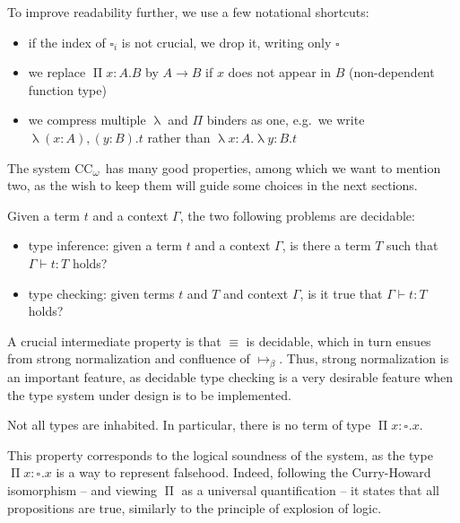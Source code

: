 \documentclass{kaobook}
\newcommand{\uni}[1][]{\square_{#1}}
\newcommand{\conv}{\equiv}
\newcommand{\red}{\mapsto}
\newcommand{\bred}{\red_\beta}
\renewcommand{\P}{\operatorname{\Pi}}
\DeclareMathOperator{\?}{?}
\renewcommand{\l}{\operatorname{\lambda}}
\newcommand{\coc}{CC\textsubscript{$\omega$}}
\begin{document}
{


To improve readability further, we use a few notational shortcuts:
\begin{itemize}
	\item if the index of $\uni[i]$ is not crucial, we drop it, writing only $\uni$
	\item we replace $ \P x : A . B$ by $A \to B$ if $x$ does not appear in $B$ (non-dependent function type)
	\item we compress multiple $\l$ and $\Pi$ binders as one, e.g.\ we write $\l (x : A),(y : B) . t$ rather than $\l x : A . \l y : B . t$
\end{itemize}

The system \coc\ has many good properties, among which we want to mention two, as the wish to keep them will guide some choices in the next sections.

\begin{prop}
	Given a term $t$ and a context $\Gamma$, the two following problems are decidable:
	\begin{itemize}
		\item type inference: given a term $t$ and a context $\Gamma$, is there a term $T$ such that $\Gamma \vdash t : T$ holds?
		\item type checking: given terms $t$ and $T$ and context $\Gamma$, is it true that $\Gamma \vdash t : T$ holds?
	\end{itemize}
\end{prop}

 A crucial intermediate property is that $\conv$ is decidable, which in turn ensues from strong normalization and confluence of $\bred$. Thus, strong normalization is an important feature, as decidable type checking is a very desirable feature when the type system under design is to be implemented.
 
\begin{prop}[Consistency]
	Not all types are inhabited. In particular, there is no term of type $ \P x : \uni . x$.
\end{prop}

This property corresponds to the logical soundness of the system, as the type $ \P x : \uni . x$ is a way to represent falsehood. Indeed, following the Curry-Howard isomorphism – and viewing $\P$ as a universal quantification – it states that all propositions are true, similarly to the principle of explosion of logic.


}
\end{document}

